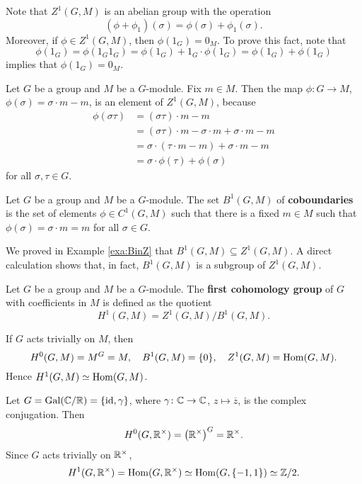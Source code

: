 Note that $Z^1(G,M)$ is an abelian group with the operation
\[
(\phi+\phi_1)(\sigma)=\phi(\sigma)+\phi_1(\sigma).
\]
Moreover, if $\phi\in Z^1(G,M)$, then 
$\phi(1_G)=0_M$. To prove this fact, note that  
\[
\phi(1_G)=\phi(1_G1_G)=\phi(1_G)+1_G\cdot\phi(1_G)=\phi(1_G)+\phi(1_G)
\]
implies
that $\phi(1_G)=0_M$. 

\begin{example}
\label{exa:BinZ}
    Let $G$ be a group and $M$ be a $G$-module. Fix $m\in M$. Then
    the map $\phi\colon G\to M$, $\phi(\sigma)=\sigma\cdot m-m$, is an element 
    of $Z^1(G,M)$, because 
    \begin{align*}
    \phi(\sigma\tau)&=(\sigma\tau)\cdot m-m\\
    &=(\sigma\tau)\cdot m-\sigma\cdot m+\sigma\cdot m-m\\
    &=\sigma\cdot (\tau\cdot m-m)+\sigma\cdot m-m\\
    &=\sigma\cdot \phi(\tau)+\phi(\sigma)   
    \end{align*}
    for all $\sigma,\tau\in G$.
\end{example}

\begin{definition}
    Let $G$ be a group and $M$ be a $G$-module. The set
    $B^1(G,M)$ of \textbf{coboundaries} is the set 
    of elements $\phi\in C^1(G,M)$ such that there is a fixed 
    $m\in M$ such that
    $\phi(\sigma)=\sigma\cdot m=m$ for all $\sigma\in G$.
\end{definition}

We proved in Example \ref{exa:BinZ} that  
$B^1(G,M)\subseteq Z^1(G,M)$. A direct calculation shows that, in fact, 
$B^1(G,M)$ is a subgroup of $Z^1(G,M)$. 

\begin{definition}
    Let $G$ be a group and $M$ be a $G$-module. The 
    \textbf{first cohomology group} of $G$ with coefficients
    in $M$ is defined as the quotient
    \[
    H^1(G,M)=Z^1(G,M)/B^1(G,M).
    \]
\end{definition}

\begin{example}
    If $G$ acts trivially on $M$, then 
    \[
    H^0(G,M)=M^G=M,
    \quad 
    B^1(G,M)=\{0\},
    \quad 
    Z^1(G,M)=\operatorname{Hom}(G,M).
    \]
    Hence 
    $H^1(G,M)\simeq\operatorname{Hom}(G,M)$.
\end{example}

\begin{example}
    Let $G=\operatorname{Gal}(\mathbb{C}/\mathbb{R})=\{\operatorname{id},\gamma\}$, where $\gamma\colon\mathbb{C}\to\mathbb{C}$, $z\mapsto\overline{z}$, is the complex conjugation. Then
    \[
    H^0(G,\mathbb{R}^\times)=\left(\mathbb{R}^\times\right)^G=\mathbb{R}^\times.
    \]
    Since $G$ acts trivially on $\mathbb{R}^\times$, 
    \[
    H^1(G,\mathbb{R}^\times)=\operatorname{Hom}(G,\mathbb{R}^\times)\simeq\operatorname{Hom}(G,\{-1,1\})\simeq\mathbb{Z}/2.
    \]
\end{example}

